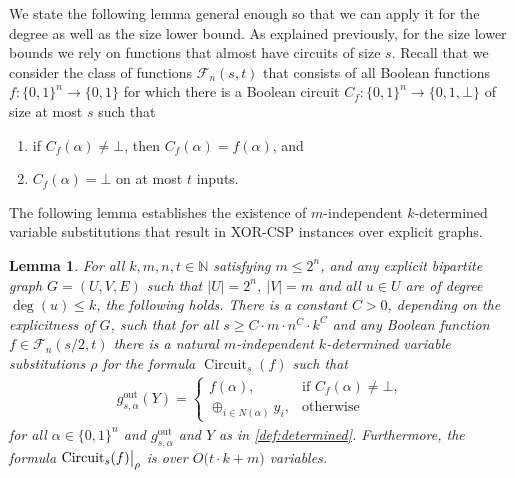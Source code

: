 \documentclass[10pt,a4paper]{article}
\theoremstyle{plain}
\newtheorem{lemma}[theorem]{Lemma}
\theoremstyle{remark}
\theoremstyle{definition}
\newcommand{\pa}[1]{}
\newcommand{\kr}[1]{}
\newcommand{\set}[1]{\{#1\}}
\newcommand\restrict[2]{{%
  \left.\kern-\nulldelimiterspace %
  #1 %
  \vphantom{\big|} %
  \right|_{#2} %
  }}
\newcommand{\calF}{\mathcal{F}}
\newcommand{\N}{\mathbb{N}}
\newcommand{\gout}{g^\mathrm{out}}
\DeclareMathOperator{\circuit}{Circuit}
\begin{document}
We state the following lemma general enough so that we can apply it
for the degree as well as the size lower bound. As explained
previously, for the size lower bounds we rely on functions that almost
have circuits of size $s$. Recall that we consider the class of
functions $\calF_n(s,t)$ that consists of all Boolean functions
$f: \set{0,1}^n \rightarrow \set{0,1}$ for which there is a Boolean
circuit $C_f: \set{0,1}^n \rightarrow \set{0, 1, \bot}$ of size at most
$s$ such that
\begin{enumerate}
\item if $C_f(\alpha) \neq \bot$, then $C_f(\alpha) = f(\alpha)$, and
\item $C_f(\alpha) = \bot$ on at most $t$ inputs.
\end{enumerate}
The following lemma establishes the existence of $m$-independent
$k$-deter\-mined variable substitutions that result in XOR-CSP instances
over explicit graphs.

\begin{lemma}
  \label{lem:restriction}
  For all $k, m, n, t \in \N$ satisfying $m \le 2^n$, and any explicit
  bipartite graph $G = (U, V, E)$ such that $|U| = 2^n$, $|V| = m$ and
  all $u \in U$ are of degree $\deg(u) \le k$, the following holds.
  There is a constant $C > 0$, depending on the explicitness of $G$,
  such that for all $s \ge C \cdot m \cdot n^C\cdot k^C$ and any
  Boolean function $f \in \calF_n(s/2,t)$ there is a natural
  $m$-independent $k$-determined variable substitutions $\rho$ for the
  formula $\circuit_s(f)$ such that
  \begin{align*}
    \gout_{s, \alpha}(Y) =
    \begin{cases}
      f(\alpha), &\text{if~} C_f(\alpha) \neq \bot,\\
      \oplus_{i \in N(\alpha)} y_i, &\text{otherwise}
    \end{cases}
  \end{align*}
  for all $\alpha \in \set{0,1}^n$ and $\gout_{s, \alpha}$ and $Y$
  as in \cref{def:determined}.  Furthermore, the formula $\restrict{\circuit_s(f)}{\rho}$ is over
  $O\big(t \cdot k + m\big)$ variables.
\end{lemma}

\end{document}

